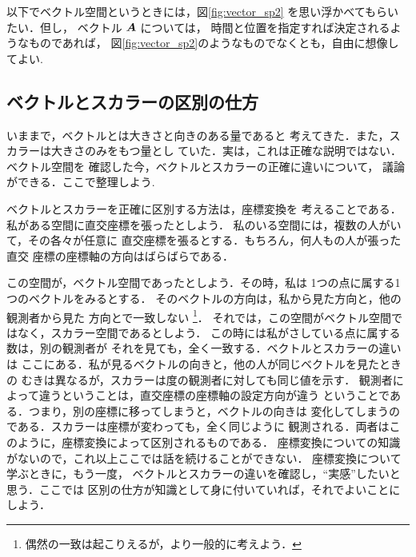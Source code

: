     以下でベクトル空間というときには，図\ref{fig:vector_sp2}
    を思い浮かべてもらいたい．但し，
    ベクトル $\boldsymbol{A}$ については，
    時間と位置を指定すれば決定されるようなものであれば，
    図\ref{fig:vector_sp2}のようなものでなくとも，自由に想像してよい.



 \subsection{ベクトルとスカラーの区別の仕方}
                いままで，ベクトルとは大きさと向きのある量であると
                考えてきた．また，スカラーは大きさのみをもつ量とし
                ていた．実は，これは正確な説明ではない．ベクトル空間を
                確認した今，ベクトルとスカラーの正確に違いについて，
                議論ができる．ここで整理しよう.

                ベクトルとスカラーを正確に区別する方法は，座標変換を
                考えることである．私がある空間に直交座標を張ったとしよう．
                私のいる空間には，複数の人がいて，その各々が任意に
                直交座標を張るとする．もちろん，何人もの人が張った直交
                座標の座標軸の方向はばらばらである．

                この空間が，ベクトル空間であったとしよう．その時，私は
                1つの点に属する1つのベクトルをみるとする．
                そのベクトルの方向は，私から見た方向と，他の観測者から見た
                方向とで一致しない
                    \footnote{
                        偶然の一致は起こりえるが，より一般的に考えよう．
                    }．
                それでは，この空間がベクトル空間ではなく，スカラー空間であるとしよう．
                この時には私がさしている点に属する数は，別の観測者が
                それを見ても，全く一致する．ベクトルとスカラーの違いは
                ここにある．私が見るベクトルの向きと，他の人が同じベクトルを見たときの
                むきは異なるが，スカラーは度の観測者に対しても同じ値を示す．
                観測者によって違うということは，直交座標の座標軸の設定方向が違う
                ということである．つまり，別の座標に移ってしまうと，ベクトルの向きは
                変化してしまうのである．スカラーは座標が変わっても，全く同じように
                観測される．両者はこのように，座標変換によって区別されるものである．
                座標変換についての知識がないので，これ以上ここでは話を続けることができない．
                座標変換について学ぶときに，もう一度，
                ベクトルとスカラーの違いを確認し，“実感”したいと思う．ここでは
                区別の仕方が知識として身に付いていれば，それでよいことにしよう．


